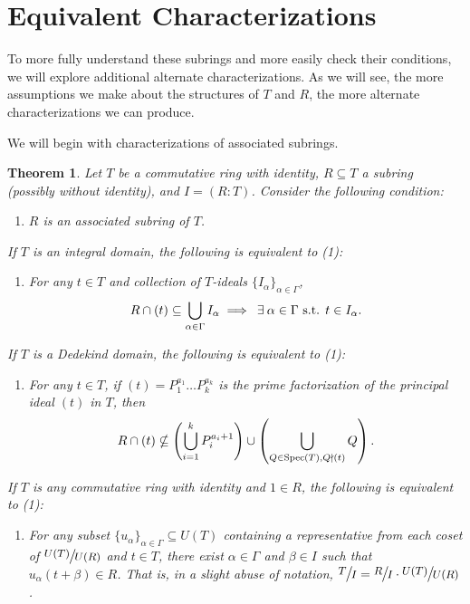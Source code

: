 \documentclass[12pt]{amsart}
\newtheorem{theorem}{Theorem}[section]
\theoremstyle{definition}
\newcommand{\st}{\textup{ s.t. }}
\newcommand{\spec}{\textup{Spec}}
\newcommand{\quot}[2]{\large\sfrac{#1}{#2}\normalsize}
\begin{document}
	\section{Equivalent Characterizations}
	To more fully understand these subrings and more easily check their conditions, we will explore additional alternate characterizations. As we will see, the more assumptions we make about the structures of $T$ and $R$, the more alternate characterizations we can produce.
	
	We will begin with characterizations of associated subrings.
	
	\begin{theorem}
		\label{as equiv conditions}
		Let $T$ be a commutative ring with identity, $R\subseteq T$ a subring (possibly without identity), and $I=(R:T)$. Consider the following condition:
		\begin{enumerate}
			\item $R$ is an associated subring of $T$.
		\end{enumerate}
		If $T$ is an integral domain, the following is equivalent to (1):
		\begin{enumerate}
			\item[(2)] For any $t\in T$ and collection of $T$-ideals $\{I_\alpha\}_{\alpha\in \Gamma}$,
			$$R\cap (t)\subseteq \bigcup_{\alpha\in \Gamma}I_\alpha \implies \:\exists\:\alpha\in \Gamma\st t\in I_\alpha.$$
		\end{enumerate}
		If $T$ is a Dedekind domain, the following is equivalent to (1):
		\begin{enumerate}
			\item[(3)] For any $t\in T$, if $(t)=P_1^{a_1}\dots P_k^{a_k}$ is the prime factorization of the principal ideal $(t)$ in $T$, then $$R\cap (t)\nsubseteq \left(\bigcup_{i=1}^kP_i^{a_i+1}\right)\cup\left(\bigcup_{Q\in\spec(T),Q\nmid (t)}Q\right).$$
		\end{enumerate}
		If $T$ is any commutative ring with identity and $1\in R$, the following is equivalent to (1):
		\begin{enumerate}
			\item[(4)] For any subset $\{u_\alpha\}_{\alpha\in \Gamma}\subseteq U(T)$ containing a representative from each coset of $\quot{U(T)}{U(R)}$ and $t\in T$, there exist $\alpha\in \Gamma$ and $\beta\in I$ such that $u_\alpha(t+\beta)\in R$. That is, in a slight abuse of notation, $\quot{T}{I}=\quot{R}{I}\cdot \quot{U(T)}{U(R)}$.
		\end{enumerate}
	\end{theorem}
	
\end{document}
